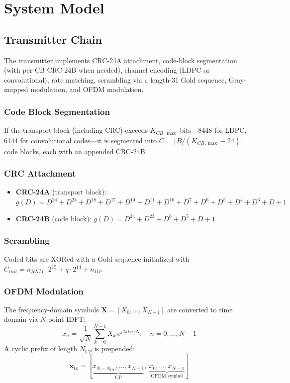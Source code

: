 \documentclass[12pt, a4paper]{article}
\begin{document}
\section{System Model}
\subsection{Transmitter Chain}
The transmitter implements CRC-24A attachment, code-block segmentation (with per-CB CRC-24B when needed), channel encoding (LDPC or convolutional), rate matching, scrambling via a length-31 Gold sequence, Gray-mapped modulation, and OFDM modulation.

\subsubsection{Code Block Segmentation}
If the transport block (including CRC) exceeds $K_{CB,\max}$ bits---8448 for LDPC, 6144 for convolutional codes---it is segmented into $C = \lceil B/(K_{CB,\max}-24)\rceil$ code blocks, each with an appended CRC-24B.

\subsubsection{CRC Attachment}
\begin{itemize}[nosep]
\item \textbf{CRC-24A} (transport block): $g(D) = D^{24}+D^{23}+D^{18}+D^{17}+D^{14}+D^{11}+D^{10}+D^{7}+D^6+D^5+D^4+D^3+D+1$
\item \textbf{CRC-24B} (code block): $g(D) = D^{24}+D^{23}+D^6+D^5+D+1$
\end{itemize}

\subsubsection{Scrambling}
Coded bits are XORed with a Gold sequence initialized with $C_{init} = n_{RNTI}\cdot 2^{15} + q\cdot 2^{14} + n_{ID}$.

\subsubsection{OFDM Modulation}
The frequency-domain symbols $\mathbf{X} = [X_0, \dots, X_{N-1}]$ are converted to time domain via $N$-point IDFT:
$$x_n = \frac{1}{\sqrt{N}} \sum_{k=0}^{N-1} X_k\, e^{j2\pi kn/N}, \quad n=0,\dots,N-1$$
A cyclic prefix of length $N_{CP}$ is prepended:
$$\mathbf{x}_{\text{tx}} = [\underbrace{x_{N-N_{CP}},\dots,x_{N-1}}_{\text{CP}},\ \underbrace{x_0,\dots,x_{N-1}}_{\text{OFDM symbol}}]$$
\end{document}
